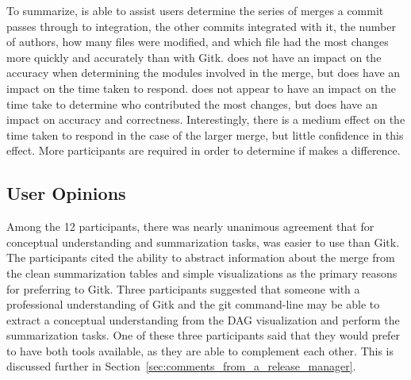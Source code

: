 To summarize, \tool{} is able to assist users determine the series of
merges a commit passes through to integration, the other commits
integrated with it, the number of authors, how many files were modified,
and which file had the most changes more quickly and accurately than
with Gitk. \tool{} does not have an impact on the accuracy when
determining the modules involved in the merge, but does have an impact
on the time taken to respond. \tool{} does not appear to have an impact
on the time take to determine who contributed the most changes, but does
have an impact on accuracy and correctness. Interestingly, there is a
medium effect on the time taken to respond in the case of the larger
merge, but little confidence in this effect. More participants are
required in order to determine if \tool{} makes a difference.

\subsection{User Opinions}
\label{sub:user_opinions_results}

Among the 12 participants, there was nearly unanimous agreement that for
conceptual understanding and summarization tasks, \tool{} was easier to
use than Gitk. The participants cited the ability to abstract
information about the merge from the clean summarization tables and
simple visualizations as the primary reasons for preferring \tool{} to
Gitk. Three participants suggested that someone with a professional
understanding of Gitk and the git command-line may be able to extract a
conceptual understanding from the DAG visualization and perform the
summarization tasks. One of these three participants said that they
would prefer to have both tools available, as they are able to
complement each other.
This is discussed further in Section~\ref{sec:comments_from_a_release_manager}.
